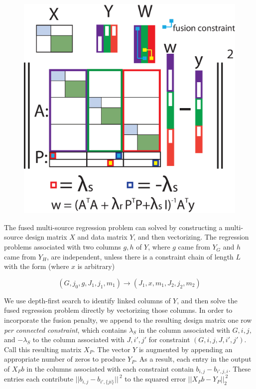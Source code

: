 \documentclass[11pt]{article}
\begin{document}
\begin{figure}[h!]
    \centering
    \includegraphics[scale=.5,trim=0mm 0mm 0mm 0mm,clip]{direct_solve.eps}
\end{figure}

The fused multi-source regression problem can solved by constructing a multi-source design matrix $X$ and data matrix $Y$, and then vectorizing.
The regression problems associated with two columns $g,h$ of $Y$, where $g$ came from $Y_G$ and $h$ came from $Y_H$, are independent, unless there is a constraint chain of length $L$ with the form (where $x$ is arbitrary)

$$(G, j_0, g, J_1, j_1, m_1) \rightarrow (J_1, x, m_1, J_2, j_2, m_2)$$

We use depth-first search to identify linked columns of $Y$, and then solve the fused regression problem directly by vectorizing those columns.
In order to incorporate the fusion penalty, we append to the resulting design matrix one row \emph{per connected constraint}, which contains $\lambda_S$ in the column associated with $G,i,j,$ and $-\lambda_S$ to the column associated with $J, i',j'$ for constraint $(G,i,j,J,i',j')$. Call this resulting matrix $X_P$.
The vector $Y$ is augmented by appending an appropriate number of zeros to produce $Y_P$. As a result, each entry in the output of $X_P b$ in the columns associated with each constraint contain $b_{i,j} - b_{i',j,i}$.
These entries each contribute  $||b_{i,j} - b_{i',\{ji\}}||^{~2}$ to the squared error $||X_Pb - Y_P||_2^{~2}$
\end{document}
